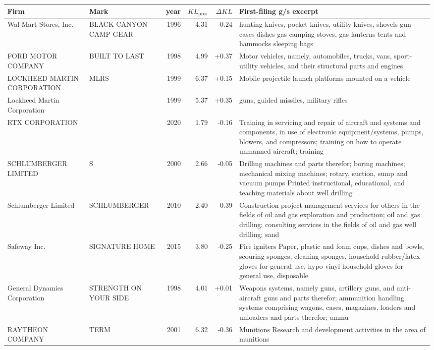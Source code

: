 \begin{tabular}{p{4.0cm}p{2.2cm}rrrp{6.5cm}}
\toprule
Firm & Mark & year & $KL_\text{pros}$ & $\Delta KL$ & First-filing g/s excerpt \\
\midrule
Wal-Mart Stores, Inc. & BLACK CANYON CAMP GEAR & 1996 & 4.31 & -0.24 & hunting knives, pocket knives, utility knives, shovels gun cases dishes gas camping stoves, gas lanterns tents and hammocks sleeping bags \\
FORD MOTOR COMPANY & BUILT TO LAST & 1998 & 4.99 & +0.37 & Motor vehicles, namely, automobiles, trucks, vans, sport-utility vehicles, and their structural parts and engines \\
LOCKHEED MARTIN CORPORATION & MLRS & 1999 & 6.37 & +0.15 & Mobile projectile launch platforms mounted on a vehicle \\
Lockheed Martin Corporation &  & 1999 & 5.37 & +0.35 & guns, guided missiles, military rifles \\
RTX CORPORATION &  & 2020 & 1.79 & -0.16 & Training in servicing and repair of aircraft and systems and components, in use of electronic equipment/systems, pumps, blowers, and compressors; training on how to operate unmanned aircraft; training \\
SCHLUMBERGER LIMITED & S & 2000 & 2.66 & -0.05 & Drilling machines and parts therefor; boring machines; mechanical mixing machines; rotary, suction, sump and vacuum pumps Printed instructional, educational, and teaching materials about well drilling \\
Schlumberger Limited & SCHLUMBERGER & 2010 & 2.40 & -0.39 & Construction project management services for others in the fields of oil and gas exploration and production; oil and gas drilling; consulting services in the fields of oil and gas well drilling; sand  \\
Safeway Inc. & SIGNATURE HOME & 2015 & 3.80 & -0.25 & Fire igniters Paper, plastic and foam cups, dishes and bowls, scouring sponges, cleaning sponges, household rubber/latex gloves for general use, hypo vinyl household gloves for general use, disposable \\
General Dynamics Corporation & STRENGTH ON YOUR SIDE & 1998 & 4.01 & +0.01 & Weapons systems, namely guns, artillery guns, and anti-aircraft guns and parts therefor; ammunition handling systems comprising wagons, cases, magazines, loaders and unloaders and parts therefor; ammu \\
RAYTHEON COMPANY & TERM & 2001 & 6.32 & -0.36 & Munitions Research and development activities in the area of munitions \\
\bottomrule
\end{tabular}
\clearpage

